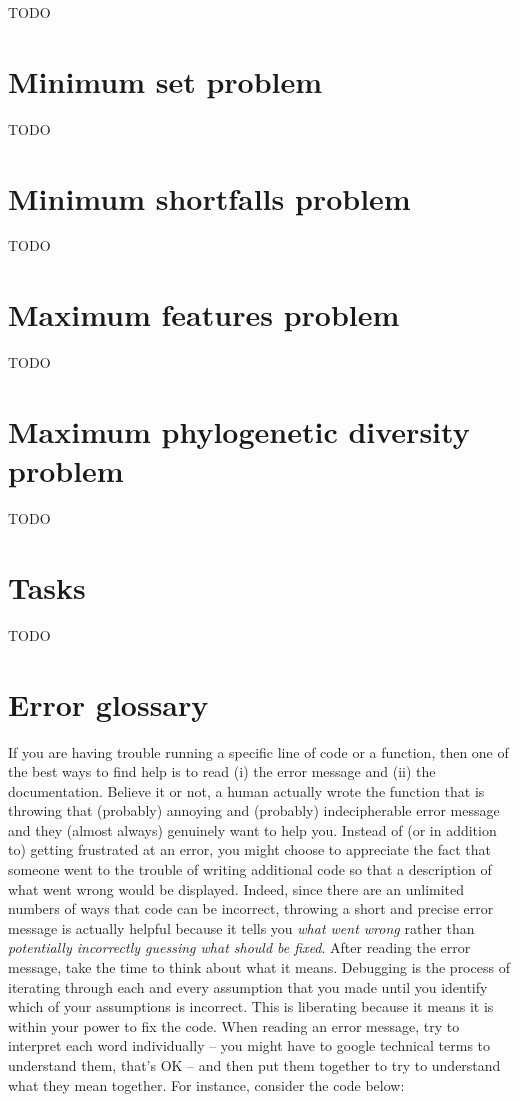 \documentclass[]{book}
\begin{document}
TODO

\chapter{Minimum set problem}\label{min-set}

TODO

\chapter{Minimum shortfalls problem}\label{min-shortfalls}

TODO

\chapter{Maximum features problem}\label{max-features}

TODO

\chapter{Maximum phylogenetic diversity problem}\label{max-phylo-div}

TODO

\chapter{Tasks}\label{tasks}

TODO

\chapter{Error glossary}\label{error-glossary}

If you are having trouble running a specific line of code or a function,
then one of the best ways to find help is to read (i) the error message
and (ii) the documentation. Believe it or not, a human actually wrote
the function that is throwing that (probably) annoying and (probably)
indecipherable error message and they (almost always) genuinely want to
help you. Instead of (or in addition to) getting frustrated at an error,
you might choose to appreciate the fact that someone went to the trouble
of writing additional code so that a description of what went wrong
would be displayed. Indeed, since there are an unlimited numbers of ways
that code can be incorrect, throwing a short and precise error message
is actually helpful because it tells you \emph{what went wrong} rather
than \emph{potentially incorrectly guessing what should be fixed}. After
reading the error message, take the time to think about what it means.
Debugging is the process of iterating through each and every assumption
that you made until you identify which of your assumptions is incorrect.
This is liberating because it means it is within your power to fix the
code. When reading an error message, try to interpret each word
individually -- you might have to google technical terms to understand
them, that's OK -- and then put them together to try to understand what
they mean together. For instance, consider the code below:
\end{document}
